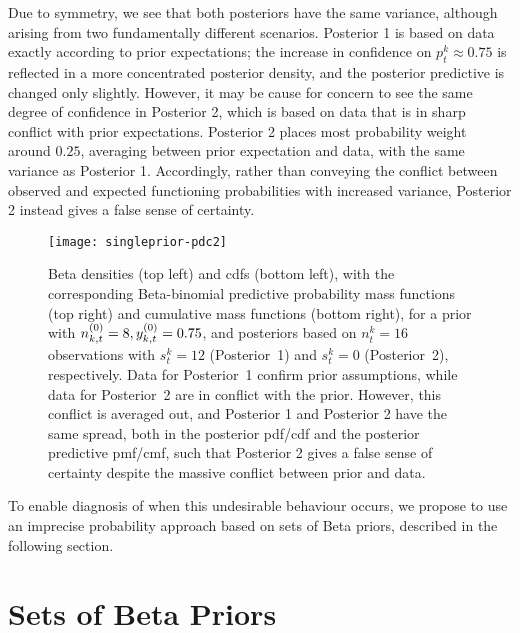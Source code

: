 \documentclass[12pt, a4paper]{elsarticle}
\newcommand{\ptk}{p^k_t}
\begin{document}
Due to symmetry, we see that both posteriors have the same variance,
although arising from two fundamentally different scenarios.
Posterior 1 is based on data exactly according to prior expectations;
the increase in confidence on $\ptk \approx 0.75$
is reflected in a more concentrated posterior density,
and the posterior predictive is changed only slightly.
However, it may be cause for concern to see the same degree of confidence in Posterior 2,
which is based on data that is in sharp conflict with prior expectations.
Posterior 2 places most probability weight around $0.25$,
averaging between prior expectation and data,
with the same variance as Posterior 1.
Accordingly, rather than conveying the conflict between observed
and expected functioning probabilities with increased variance,
Posterior 2 instead gives a false sense of certainty.

\begin{figure}
\texttt{[image: singleprior-pdc2]}
\caption{Beta densities (top left) and cdfs (bottom left),
with the corresponding Beta-binomial predictive probability mass functions (top right) and cumulative mass functions (bottom right),
for a prior with $n^{(0)}_{k,t} = 8, y^{(0)}_{k,t} = 0.75$,
and posteriors based on $n^k_t=16$ observations with $s^k_t=12$ (Posterior~1) and $s^k_t=0$ (Posterior~2), respectively.
Data for Posterior~1 confirm prior assumptions,
while data for Posterior~2 are in conflict with the prior.
However, this conflict is averaged out,
and Posterior 1 and Posterior 2 have the same spread, both in the posterior pdf/cdf and the posterior predictive pmf/cmf,
such that Posterior 2 gives a false sense of certainty despite the massive conflict between prior and data.}
\label{fig:singleprior-pdc}
\end{figure}

To enable diagnosis of when this undesirable behaviour occurs,
we propose to use an imprecise probability approach
based on sets of Beta priors, described in the following section.


\section{Sets of Beta Priors}
\label{sec:setsofbetapriors}
\end{document}

